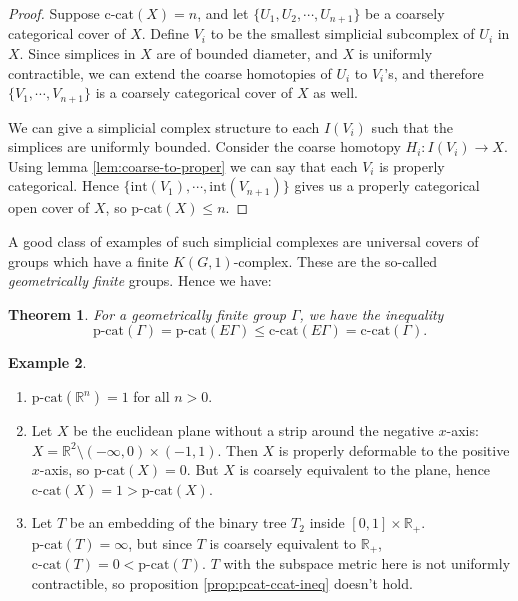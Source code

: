 \documentclass {amsart}
\newcommand {\ccat}     {\text{c-cat}}
\newcommand {\pcat}     {\text{p-cat}}
\newcommand {\interior}    {\text{int}}
\newcommand {\R}        {\mathbb{R}}
\newcommand {\Rplus}    {\mathbb{R}_{+}}
\newtheorem   {theorem}               {Theorem}       [section]
\theoremstyle {definition}
\newtheorem   {example}  [theorem] {Example}
\begin{document}
\begin{proof}
    Suppose \( \ccat(X) = n \), and let \( \{ U_1, U_2, \cdots, U_{n+1} \} \) be a
    coarsely categorical cover of \( X \). Define \( V_i \) to be the smallest 
    simplicial subcomplex of \( U_i \) in \( X \). Since simplices in \( X \) are of
    bounded diameter, and \( X \) is uniformly contractible, we can extend the
    coarse homotopies of \( U_i \) to \( V_i \)'s, and therefore \( \{ V_1, \cdots,
    V_{n+1} \} \) is a coarsely categorical cover of \( X \) as well.

    We can give a simplicial complex structure to each \( I(V_i) \) such that the
    simplices are uniformly bounded. Consider the coarse homotopy \( H_i : I(V_i)
    \to X \). Using lemma \ref{lem:coarse-to-proper} we can say that each \( V_i
    \) is properly categorical. Hence \( \{ \interior(V_1) , \cdots , \interior(V_{n+1}) \} \) gives us
    a properly categorical open cover of \( X \), so \( \pcat(X) \leq n \).
\end{proof}

A good class of examples of such simplicial complexes are universal covers of
groups which have a finite \( K(G,1) \)-complex. These are the so-called
\emph{geometrically finite} groups. Hence we have:

\begin{theorem}
    \label{thm:pcat-ccat}
    For a geometrically finite group \( \Gamma \), we have the inequality
    \[
        \pcat (\Gamma) = \pcat(E \Gamma) \leq \ccat (E \Gamma) = \ccat(\Gamma)
        .
    \]
\end{theorem}

\begin{example}
    \begin{enumerate}
        \item \( \pcat (\R^{n}) = 1 \) for all \( n > 0 \).
        \item Let \( X \) be the euclidean plane without a strip around the negative
            \( x \)-axis: \( X = \R^{2} \setminus (-\infty, 0) \times (-1,1) \). 
            Then \( X \) is properly deformable to the positive \( x \)-axis, so \(
            \pcat (X) = 0 \). But \( X \) is coarsely equivalent to the plane, hence
            \( \ccat (X) = 1 > \pcat (X) \).
        \item Let \( T \) be an embedding of the binary tree \( T_2 \) inside \( [0,1] 
            \times \Rplus \). \( \pcat (T) = \infty \), but since \( T \) is coarsely
            equivalent to \( \Rplus \), \( \ccat(T) = 0 < \pcat(T) \). \( T \)
            with the subspace metric here is not uniformly contractible, so
            proposition \ref{prop:pcat-ccat-ineq} doesn't hold.
    \end{enumerate}
\end{example}
\end{document}
